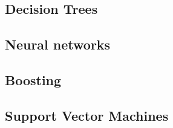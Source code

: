 \documentclass{acm_proc_article-sp}
\begin{document}




\subsection{Decision Trees}

\subsection{Neural networks}

\subsection{Boosting}

\subsection{Support Vector Machines}
\end{document}
